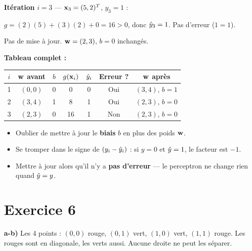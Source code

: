 \medskip
\textbf{It\'{e}ration $i = 3$} --- $\mathbf{x}_3 = (5, 2)^T$, $y_3 = 1$ :

$g = (2)(5) + (3)(2) + 0 = 16 > 0$, donc $\hat{y}_3 = 1$. Pas d'erreur ($1 = 1$).

Pas de mise \`{a} jour. $\mathbf{w} = (2, 3)$, $b = 0$ inchang\'{e}s.

\medskip
\textbf{Tableau complet :}
\begin{center}
\renewcommand{\arraystretch}{1.3}
\begin{tabular}{c|c|c|c|c|c|c}
    \toprule
    $i$ & $\mathbf{w}$ avant & $b$ & $g(\mathbf{x}_i)$ & $\hat{y}_i$ & Erreur ? & $\mathbf{w}$ apr\`{e}s \\
    \midrule
    1 & $(0, 0)$ & 0 & 0  & 0 & Oui & $(3, 4)$, $b{=}1$ \\
    2 & $(3, 4)$ & 1 & 8  & 1 & Oui & $(2, 3)$, $b{=}0$ \\
    3 & $(2, 3)$ & 0 & 16 & 1 & Non & $(2, 3)$, $b{=}0$ \\
    \bottomrule
\end{tabular}
\end{center}

\begin{attentionbox}
\begin{itemize}
    \item Oublier de mettre \`{a} jour le \textbf{biais} $b$ en plus des poids $\mathbf{w}$.
    \item Se tromper dans le signe de $(y_i - \hat{y}_i)$ : si $y=0$ et $\hat{y}=1$, le facteur est $-1$.
    \item Mettre \`{a} jour alors qu'il n'y a \textbf{pas d'erreur} --- le perceptron ne change rien quand $\hat{y} = y$.
\end{itemize}
\end{attentionbox}

\section*{Exercice 6 \hfill \exointermediaire}

\separateur

\textbf{a-b)} Les 4 points : $(0,0)$ rouge, $(0,1)$ vert, $(1,0)$ vert, $(1,1)$ rouge.
Les rouges sont en diagonale, les verts aussi. Aucune droite ne peut les s\'{e}parer.

